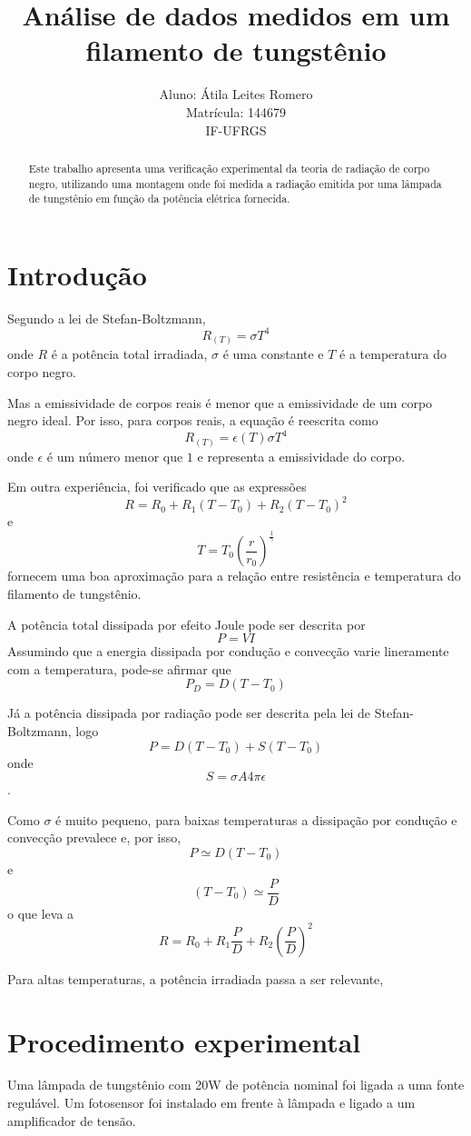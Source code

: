 \documentclass[brazilian,12pt,a4paper,final]{article}
\title{Análise de dados medidos em um filamento de tungstênio}
\author{Aluno: Átila Leites Romero \\ Matrícula: 144679 \\ IF-UFRGS}
\begin{document}
\maketitle

\begin{abstract}
Este trabalho apresenta uma verificação experimental da teoria de radiação de corpo negro, 
utilizando uma montagem onde foi medida a radiação emitida por uma lâmpada de tungstênio 
em função da potência elétrica fornecida.
\end{abstract}

\section{Introdução}
Segundo a lei de Stefan-Boltzmann,
$$ R_{(T)}=\sigma T^4$$
onde $R$ é a potência total irradiada, $\sigma$ é uma constante 
e $T$ é a temperatura do corpo negro. 

Mas a emissividade de corpos reais é menor que a emissividade de um corpo negro ideal.
Por isso, para corpos reais, a equação é reescrita como 
$$ R_{(T)}=\epsilon(T)\sigma T^4$$
onde $\epsilon$ é um número menor que $1$ e representa a emissividade do corpo.

Em outra experiência, foi verificado que as expressões
$$R=R_0+R_1(T-T_0)+R_2(T-T_0)^2$$ 
e 
$$T=T_0(\frac{r}{r_0})^\frac{1}{\gamma}$$
fornecem uma boa aproximação para a
relação entre resistência e temperatura do filamento de tungstênio.

A potência total dissipada por efeito Joule pode ser descrita por 
$$P=VI$$ 
Assumindo que a energia dissipada por condução e convecção varie lineramente 
com a temperatura, pode-se afirmar que 
$$P_D=D(T-T_0)$$

Já a potência dissipada por radiação pode ser descrita pela lei de Stefan-Boltzmann, 
logo 
$$P=D(T-T_0)+S(T-T_0)$$
onde 
$$S=\sigma A 4\pi\epsilon$$.

Como $\sigma$ é muito pequeno, 
para baixas temperaturas a dissipação por condução e convecção prevalece e,
por isso, 
$$P\simeq D(T-T_0)$$ 
e 
$$(T-T_0)\simeq \frac{P}{D}$$
o que leva a 
$$R=R_0+R_1\frac{P}{D}+R_2(\frac{P}{D})^2$$

Para altas temperaturas, a potência irradiada passa a ser relevante, 

\section{Procedimento experimental}
Uma lâmpada de tungstênio com 20W de potência nominal foi ligada a uma fonte regulável. 
Um fotosensor foi instalado em frente à lâmpada e ligado a um amplificador de tensão.
\end{document}
